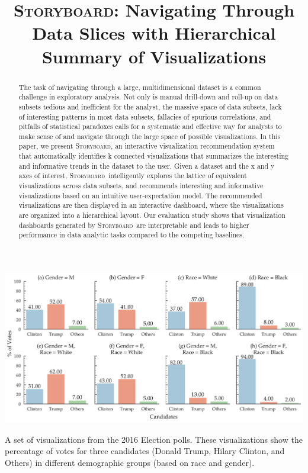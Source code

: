 \documentclass[sigchi, review]{acmart}
\newcommand{\system}{\textsc{Storyboard}\xspace}
\def\plainauthor{Doris Jung-Lin Lee*, Himel Dev*, Huizi Hu, Hazem Elmeleegy, Aditya Parameswaran}
\begin{document}
\title{\system : Navigating Through Data Slices with Hierarchical Summary of Visualizations}
\begin{abstract}
The task of navigating through a large, multidimensional dataset is a common challenge in exploratory analysis. Not only is manual drill-down and roll-up on data subsets tedious and inefficient for the analyst, the massive space of data subsets, lack of interesting patterns in most data subsets, fallacies of spurious correlations, and pitfalls of statistical paradoxes calls for a systematic and effective way for analysts to make sense of and navigate through the large space of possible visualizations. In this paper, we present \system, an interactive visualization recommendation system that automatically identifies k connected visualizations that summarizes the interesting and informative trends in the dataset to the user. Given a dataset and the x and y axes of interest, \system\ intelligently explores the lattice of equivalent visualizations across data subsets, and recommends interesting and informative visualizations based on an intuitive user-expectation model. The recommended visualizations are then displayed in an interactive dashboard, where the visualizations are organized into a hierarchical layout. Our evaluation study shows that visualization dashboards generated by \system\ are interpretable and leads to higher performance in data analytic tasks compared to the competing baselines.
\end{abstract}
\begin{teaserfigure}
  \centering
  \includegraphics[width=\linewidth]{figures/US_Election_Example.pdf}
  \caption{A set of visualizations from the 2016 Election polls. These visualizations show the percentage of votes for three candidates (Donald Trump, Hilary Clinton, and Others) in different demographic groups (based on race and gender).}
  \label{fig:elections_example}
\end{teaserfigure}
\end{document}
